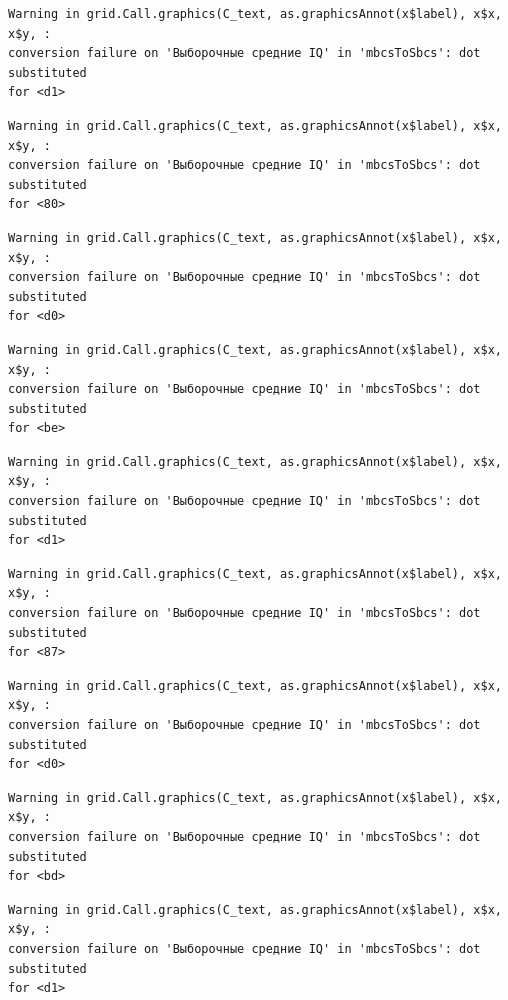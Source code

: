 \documentclass[
  letterpaper,
]{scrbook}
\theoremstyle{definition}
\theoremstyle{remark}
\begin{document}
\begin{verbatim}
Warning in grid.Call.graphics(C_text, as.graphicsAnnot(x$label), x$x, x$y, :
conversion failure on 'Выборочные средние IQ' in 'mbcsToSbcs': dot substituted
for <d1>
\end{verbatim}

\begin{verbatim}
Warning in grid.Call.graphics(C_text, as.graphicsAnnot(x$label), x$x, x$y, :
conversion failure on 'Выборочные средние IQ' in 'mbcsToSbcs': dot substituted
for <80>
\end{verbatim}

\begin{verbatim}
Warning in grid.Call.graphics(C_text, as.graphicsAnnot(x$label), x$x, x$y, :
conversion failure on 'Выборочные средние IQ' in 'mbcsToSbcs': dot substituted
for <d0>
\end{verbatim}

\begin{verbatim}
Warning in grid.Call.graphics(C_text, as.graphicsAnnot(x$label), x$x, x$y, :
conversion failure on 'Выборочные средние IQ' in 'mbcsToSbcs': dot substituted
for <be>
\end{verbatim}

\begin{verbatim}
Warning in grid.Call.graphics(C_text, as.graphicsAnnot(x$label), x$x, x$y, :
conversion failure on 'Выборочные средние IQ' in 'mbcsToSbcs': dot substituted
for <d1>
\end{verbatim}

\begin{verbatim}
Warning in grid.Call.graphics(C_text, as.graphicsAnnot(x$label), x$x, x$y, :
conversion failure on 'Выборочные средние IQ' in 'mbcsToSbcs': dot substituted
for <87>
\end{verbatim}

\begin{verbatim}
Warning in grid.Call.graphics(C_text, as.graphicsAnnot(x$label), x$x, x$y, :
conversion failure on 'Выборочные средние IQ' in 'mbcsToSbcs': dot substituted
for <d0>
\end{verbatim}

\begin{verbatim}
Warning in grid.Call.graphics(C_text, as.graphicsAnnot(x$label), x$x, x$y, :
conversion failure on 'Выборочные средние IQ' in 'mbcsToSbcs': dot substituted
for <bd>
\end{verbatim}

\begin{verbatim}
Warning in grid.Call.graphics(C_text, as.graphicsAnnot(x$label), x$x, x$y, :
conversion failure on 'Выборочные средние IQ' in 'mbcsToSbcs': dot substituted
for <d1>
\end{verbatim}
\end{document}
